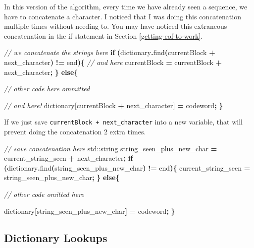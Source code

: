 \documentclass[12pt,twoside]{reedthesis}
\newenvironment{Shaded}{\begin{snugshade}}{\end{snugshade}}
\newcommand{\BuiltInTok}[1]{#1}
\newcommand{\CommentTok}[1]{\textcolor[rgb]{0.56,0.35,0.01}{\textit{#1}}}
\newcommand{\ControlFlowTok}[1]{\textcolor[rgb]{0.13,0.29,0.53}{\textbf{#1}}}
\newcommand{\NormalTok}[1]{#1}
\newcommand{\OperatorTok}[1]{\textcolor[rgb]{0.81,0.36,0.00}{\textbf{#1}}}
\begin{document}
In this version of the algorithm, every time we have already seen a sequence, we have to concatenate a character. I noticed that I was doing this concatenation multiple times without needing to. You may have noticed this extraneous concatenation in the if statement in Section \ref{getting-eof-to-work}.
\begin{Shaded}
\begin{Highlighting}[]
\CommentTok{// we concatenate the strings here}
\ControlFlowTok{if} \OperatorTok{(}\NormalTok{dictionary}\OperatorTok{.}\NormalTok{find}\OperatorTok{(}\NormalTok{currentBlock }\OperatorTok{+}\NormalTok{ next\_character}\OperatorTok{)} \OperatorTok{!=}\NormalTok{ end}\OperatorTok{)\{}
    \CommentTok{// and here}
\NormalTok{    currentBlock }\OperatorTok{=}\NormalTok{ currentBlock }\OperatorTok{+}\NormalTok{ next\_character}\OperatorTok{;}
\OperatorTok{\}}
\ControlFlowTok{else}\OperatorTok{\{}

    \CommentTok{// other code here ommitted}


    \CommentTok{// and here! }
\NormalTok{    dictionary}\OperatorTok{[}\NormalTok{currentBlock }\OperatorTok{+}\NormalTok{ next\_character}\OperatorTok{]} \OperatorTok{=}\NormalTok{ codeword}\OperatorTok{;}
\OperatorTok{\}}
\end{Highlighting}
\end{Shaded}
If we just save \texttt{currentBlock\ +\ next\_character} into a new variable, that will prevent doing the concatenation 2 extra times.
\begin{Shaded}
\begin{Highlighting}[]
\CommentTok{// save concatenation here}
\BuiltInTok{std::}\NormalTok{string}\OperatorTok{ }\NormalTok{string\_seen\_plus\_new\_char }\OperatorTok{=}\NormalTok{ current\_string\_seen }\OperatorTok{+}\NormalTok{ next\_character}\OperatorTok{;}
\ControlFlowTok{if} \OperatorTok{(}\NormalTok{dictionary}\OperatorTok{.}\NormalTok{find}\OperatorTok{(}\NormalTok{string\_seen\_plus\_new\_char}\OperatorTok{)} \OperatorTok{!=}\NormalTok{ end}\OperatorTok{)\{}
\NormalTok{    current\_string\_seen }\OperatorTok{=}\NormalTok{ string\_seen\_plus\_new\_char}\OperatorTok{;}
\OperatorTok{\}}
\ControlFlowTok{else}\OperatorTok{\{}

\CommentTok{// other code omitted here}

\NormalTok{    dictionary}\OperatorTok{[}\NormalTok{string\_seen\_plus\_new\_char}\OperatorTok{]} \OperatorTok{=}\NormalTok{ codeword}\OperatorTok{;}
\OperatorTok{\}}
\end{Highlighting}
\end{Shaded}
\hypertarget{dictionary-lookups}{%
\subsection{Dictionary Lookups}\label{dictionary-lookups}}
\end{document}

